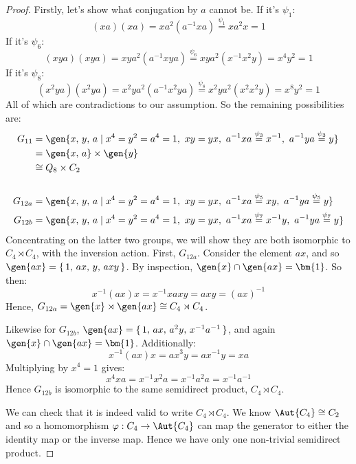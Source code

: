 \begin{proof}
    Firstly, let's show what conjugation by \(a\) cannot be.
    If it's \(\psi_1\):
    \[(xa)(xa) = xa^2(a^{-1}xa) \overset{\psi_1}{=} xa^2 x = 1\]
    If it's \(\psi_6\):
    \[(xya)(xya) = xya^2(a^{-1}xya) \overset{\psi_6}{=} xya^2(x^{-1}x^2y) = x^4 y^2 = 1\]
    If it's \(\psi_8\):
    \[(x^2 ya)(x^2 ya) = x^2 ya^2 (a^{-1}x^2 ya) \overset{\psi_8}{=} x^2 ya^2(x^2 x^2 y) = x^8 y^2 = 1\]
    All of which are contradictions to our assumption.
    So the remaining possibilities are:
    \begin{align*}
        G_{11} &= \gen{x,\,y,\,a \mid x^4 = y^2 = a^4 = 1,\ xy = yx,\ a^{-1}xa \overset{\psi_3}{=} x^{-1},\ a^{-1}ya \overset{\psi_3}{=} y} \\
            &= \gen{x,\,a} \times \gen{y} \\
            &\cong Q_8 \times C_2 \\
            & \\
        G_{12a} &= \gen{x,\,y,\,a \mid x^4 = y^2 = a^4 = 1,\ xy = yx,\ a^{-1}xa \overset{\psi_5}{=} xy,\ a^{-1}ya \overset{\psi_5}{=} y} \\
        G_{12b} &= \gen{x,\,y,\,a \mid x^4 = y^2 = a^4 = 1,\ xy = yx,\ a^{-1}xa \overset{\psi_7}{=} x^{-1}y,\ a^{-1}ya \overset{\psi_7}{=} y}
    \end{align*}
    Concentrating on the latter two groups, we will show they are both isomorphic to \(C_4 \rtimes C_4\),
    with the inversion action.
    First, \(G_{12a}\).
    Consider the element \(ax\), and so \(\gen{ax} = \{\,1,\,ax,\,y,\,axy\,\}\).
    By inspection, \(\gen{x} \cap \gen{ax} = \bm{1}\).
    So then:
    \[x^{-1}(ax)x = x^{-1}xaxy = axy = {(ax)}^{-1}\]
    Hence, \(G_{12a} = \gen{x} \rtimes \gen{ax} \cong C_4 \rtimes C_4\).

    Likewise for \(G_{12b}\), \(\gen{ax} = \{\,1,\,ax,\,a^2 y,\,x^{-1}a^{-1}\,\}\), and again \(\gen{x} \cap
    \gen{ax} = \bm{1}\).
    Additionally:
    \[x^{-1}(ax)x = ax^3 y = ax^{-1}y = xa\]
    Multiplying by \(x^4 = 1\) gives:
    \[x^4 xa = x^{-1}x^2 a = x^{-1}a^2 a = x^{-1}a^{-1}\]
    Hence \(G_{12b}\) is isomorphic to the same semidirect product, \(C_4 \rtimes C_4\).

    We can check that it is indeed valid to write \(C_4 \rtimes C_4\).
    We know \(\Aut{C_4} \cong C_2\) and so a homomorphism \(\varphi:C_4 \to \Aut{C_4}\) can map the
    generator to either the identity map or the inverse map.
    Hence we have only one non-trivial semidirect product.
\end{proof}

